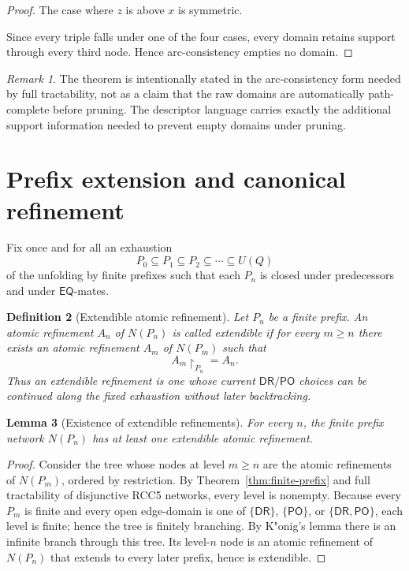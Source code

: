 \documentclass[11pt]{article}
\newtheorem{definition}{Definition}[section]
\newtheorem{lemma}[definition]{Lemma}
\theoremstyle{remark}
\newtheorem{remark}[definition]{Remark}
\newcommand{\DR}{\mathsf{DR}}
\newcommand{\PO}{\mathsf{PO}}
\newcommand{\EQ}{\mathsf{EQ}}
\begin{document}
\begin{proof}
The case where $z$ is above $x$ is symmetric.

Since every triple falls under one of the four cases, every domain retains support through every third node. Hence arc-consistency empties no domain.
\end{proof}

\begin{remark}
The theorem is intentionally stated in the arc-consistency form needed by full tractability, not as a claim that the raw domains are automatically path-complete before pruning. The descriptor language carries exactly the additional support information needed to prevent empty domains under pruning.
\end{remark}


\section{Prefix extension and canonical refinement}

Fix once and for all an exhaustion
\[
P_0\subseteq P_1\subseteq P_2\subseteq\cdots\subseteq U(Q)
\]
of the unfolding by finite prefixes such that each $P_n$ is closed under predecessors and under $\EQ$-mates.

\begin{definition}[Extendible atomic refinement]\label{def:extendible-refinement}
Let $P_n$ be a finite prefix. An atomic refinement $A_n$ of $N(P_n)$ is called \emph{extendible} if for every $m\ge n$ there exists an atomic refinement $A_m$ of $N(P_m)$ such that
\[
A_m\!\upharpoonright_{P_n}=A_n.
\]
Thus an extendible refinement is one whose current $\DR/\PO$ choices can be continued along the fixed exhaustion without later backtracking.
\end{definition}

\begin{lemma}[Existence of extendible refinements]\label{lem:existence-extendible}
For every $n$, the finite prefix network $N(P_n)$ has at least one extendible atomic refinement.
\end{lemma}

\begin{proof}
Consider the tree whose nodes at level $m\ge n$ are the atomic refinements of $N(P_m)$, ordered by restriction. By Theorem~\ref{thm:finite-prefix} and full tractability of disjunctive RCC5 networks, every level is nonempty. Because every $P_m$ is finite and every open edge-domain is one of $\{\DR\}$, $\{\PO\}$, or $\{\DR,\PO\}$, each level is finite; hence the tree is finitely branching. By K"onig's lemma there is an infinite branch through this tree. Its level-$n$ node is an atomic refinement of $N(P_n)$ that extends to every later prefix, hence is extendible.
\end{proof}
\end{document}
